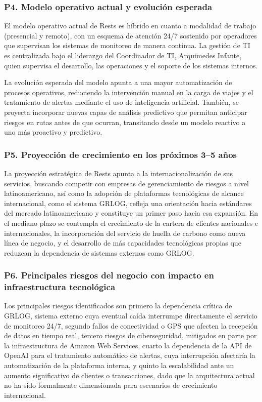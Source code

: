 \documentclass[12pt]{article}
\begin{document}
\subsubsection*{\textbf{P4. Modelo operativo actual y evoluci\'on esperada}}

El modelo operativo actual de Rests es h\'ibrido en cuanto a modalidad de trabajo (presencial y
remoto), con un esquema de atenci\'on 24/7 sostenido por operadores que supervisan los sistemas
de monitoreo de manera continua. La gesti\'on de TI es centralizada bajo el liderazgo del
Coordinador de TI, Arquimedes Infante, quien supervisa el desarrollo, las operaciones y el soporte
de los sistemas internos.

La evoluci\'on esperada del modelo apunta a una mayor automatizaci\'on de procesos operativos,
reduciendo la intervenci\'on manual en la carga de viajes y el tratamiento de alertas mediante
el uso de inteligencia artificial. También, se proyecta incorporar nuevas capas de an\'alisis
predictivo que permitan anticipar riesgos en rutas antes de que ocurran, transitando desde un
modelo reactivo a uno m\'as proactivo y predictivo.

\subsubsection*{\textbf{P5. Proyecci\'on de crecimiento en los pr\'oximos 3--5 a\~nos}}

La proyecci\'on estrat\'egica de Rests apunta a la internacionalizaci\'on de sus servicios,
buscando competir con empresas de gerenciamiento de riesgos a nivel latinoamericano, así como la adopci\'on de plataformas tecnol\'ogicas de alcance internacional, como el sistema GRLOG, refleja una orientaci\'on hacia est\'andares del mercado latinoamericano y constituye un primer paso hacia esa expansi\'on. En el mediano plazo se contempla el crecimiento de la cartera de clientes nacionales e internacionales, la incorporaci\'on del servicio de huella de
carbono como nueva l\'inea de negocio, y el desarrollo de m\'as capacidades tecnol\'ogicas
propias que reduzcan la dependencia de sistemas externos como GRLOG.

\subsubsection*{\textbf{P6. Principales riesgos del negocio con impacto en infraestructura tecnol\'ogica}}

Los principales riesgos identificados son primero la dependencia cr\'itica de GRLOG,
sistema externo cuya eventual ca\'ida interrumpe directamente el servicio de monitoreo 24/7,
segundo fallos de conectividad o GPS que afecten la recepci\'on de datos en tiempo real,
tercero riesgos de ciberseguridad, mitigados en parte por la infraestructura de Amazon
Web Services, cuarto la dependencia de la API de OpenAI para el tratamiento autom\'atico
de alertas, cuya interrupci\'on afectar\'ia la automatizaci\'on de la plataforma interna, y
quinto la escalabilidad ante un aumento significativo de clientes o transacciones, dado
que la arquitectura actual no ha sido formalmente dimensionada para escenarios de crecimiento
internacional.
\end{document}
